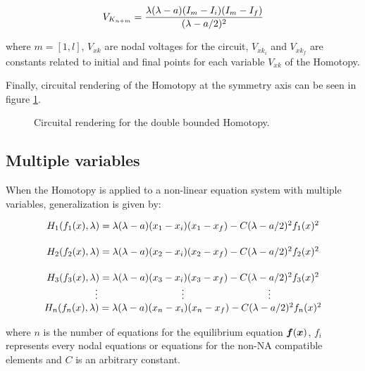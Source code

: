 \documentclass[journal,twocolumn]{IEEEtran}
\newcommand{\pig}[1]{\mbox{\boldmath ${#1}$}	}
\begin{document}
\begin{equation}
V_{K_{n+m}}={\lambda(\lambda-a)(I_{m}-I_{i})(I_m-I_{f}) \over (\lambda-a/2)^2}
\label{Ikn}
\end{equation}

where $m=[1, l]$, $V_{xk}$ are nodal voltages for the circuit, $V_{{xk}_i}$ and $V_{{xk}_f}$ are constants related to initial and final points for each variable $V_{xk}$ of the Homotopy.

Finally, circuital rendering of the Homotopy at the symmetry axis can be seen in figure \ref{circ1}.

\begin{figure}[tbp]
\centerline{
\epsfxsize=100mm
}
\caption{Circuital rendering for the double bounded Homotopy.}
\label{circ1}
\end{figure}

\subsection{Multiple variables}

When the Homotopy is applied to a non-linear equation system with multiple variables,  generalization is given by:

{\tiny
\begin{displaymath}
\begin{array}{c}
H_1(f_1(x),\lambda)=\lambda(\lambda-a)(x_1-x_i)(x_1-x_f)-C(\lambda-a/2)^2f_1(x)^2 \vspace{5mm} \\
H_2(f_2(x),\lambda)=\lambda(\lambda-a)(x_2-x_i)(x_2-x_f)-C(\lambda-a/2)^2f_2(x)^2 \vspace{5mm} \\
H_3(f_3(x),\lambda)=\lambda(\lambda-a)(x_3-x_i)(x_3-x_f)-C(\lambda-a/2)^2f_3(x)^2 \\
\vdots  \hspace{30mm} \vdots  \hspace{30mm} \vdots \\
H_n(f_n(x),\lambda)=\lambda(\lambda-a)(x_n-x_i)(x_n-x_f)-C(\lambda-a/2)^2f_n(x)^2 \\
\end{array}
\end{displaymath}}

where $n$ is the number of equations for the equilibrium equation $\pig{f}(\pig{x})$, $f_i$ represents every nodal equations or equations for the non-NA compatible elements \cite{mnaxx} and $C$ is an arbitrary constant.
\end{document}
